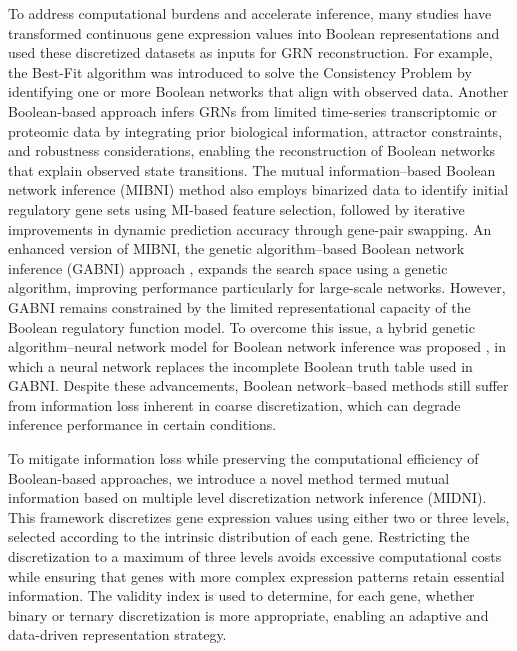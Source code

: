To address computational burdens and accelerate inference, many studies have transformed continuous gene expression values into Boolean representations and used these discretized datasets as inputs for GRN reconstruction. For example, the Best-Fit algorithm \parencite{Lahdesmaki2003} was introduced to solve the Consistency Problem by identifying one or more Boolean networks that align with observed data. Another Boolean-based approach \parencite{Haider2012} infers GRNs from limited time-series transcriptomic or proteomic data by integrating prior biological information, attractor constraints, and robustness considerations, enabling the reconstruction of Boolean networks that explain observed state transitions. The mutual information–based Boolean network inference (MIBNI) method \parencite{Barman2017} also employs binarized data to identify initial regulatory gene sets using MI-based feature selection, followed by iterative improvements in dynamic prediction accuracy through gene-pair swapping. An enhanced version of MIBNI, the genetic algorithm–based Boolean network inference (GABNI) approach \parencite{Barman2018}, expands the search space using a genetic algorithm, improving performance particularly for large-scale networks. However, GABNI remains constrained by the limited representational capacity of the Boolean regulatory function model. To overcome this issue, a hybrid genetic algorithm–neural network model for Boolean network inference was proposed \parencite{Barman2020}, in which a neural network replaces the incomplete Boolean truth table used in GABNI. Despite these advancements, Boolean network–based methods still suffer from information loss inherent in coarse discretization, which can degrade inference performance in certain conditions.

To mitigate information loss while preserving the computational efficiency of Boolean-based approaches, we introduce a novel method termed mutual information based on multiple level discretization network inference (MIDNI). This framework discretizes gene expression values using either two or three levels, selected according to the intrinsic distribution of each gene. Restricting the discretization to a maximum of three levels avoids excessive computational costs while ensuring that genes with more complex expression patterns retain essential information. The validity index \parencite{MacQueen1967, Ahn2019, Ray1999, Halkidi2001} is used to determine, for each gene, whether binary or ternary discretization is more appropriate, enabling an adaptive and data-driven representation strategy.

